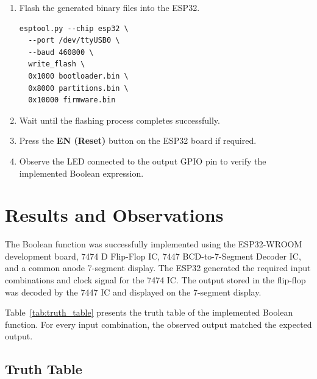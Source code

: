 \documentclass[12pt,a4paper]{article}
\begin{document}
\begin{enumerate}
\item Flash the generated binary files into the ESP32.

\begin{verbatim}
esptool.py --chip esp32 \
  --port /dev/ttyUSB0 \
  --baud 460800 \
  write_flash \
  0x1000 bootloader.bin \
  0x8000 partitions.bin \
  0x10000 firmware.bin
\end{verbatim}

\item Wait until the flashing process completes successfully.

\item Press the \textbf{EN (Reset)} button on the ESP32 board if required.

\item Observe the LED connected to the output GPIO pin to verify the implemented Boolean expression.

\end{enumerate}
\section*{Results and Observations}

The Boolean function was successfully implemented using the ESP32-WROOM development board, 7474 D Flip-Flop IC, 7447 BCD-to-7-Segment Decoder IC, and a common anode 7-segment display. The ESP32 generated the required input combinations and clock signal for the 7474 IC. The output stored in the flip-flop was decoded by the 7447 IC and displayed on the 7-segment display.

Table~\ref{tab:truth_table} presents the truth table of the implemented Boolean function. For every input combination, the observed output matched the expected output.
\subsection*{Truth Table}
\end{document}
